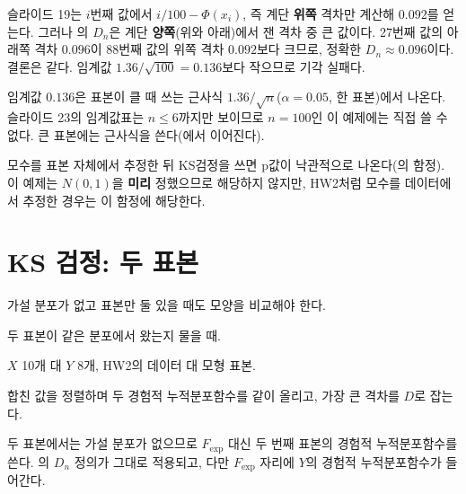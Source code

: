 \begin{pitfall}[슬라이드 값은 $D_n = 0.092$, 다시 계산하면 $D_n =
0.096$]
슬라이드 19는 $i$번째 값에서 $i/100 - \Phi(x_i)$, 즉 계단
\textbf{위쪽} 격차만 계산해 $0.092$를 얻는다. 그러나
의 $D_n$은 계단 \textbf{양쪽}(위와 아래)에서
잰 격차 중 큰 값이다. 27번째 값의 아래쪽 격차 $0.096$이 88번째 값의
위쪽 격차 $0.092$보다 크므로, 정확한 $D_n \approx 0.096$이다.
결론은 같다. 임계값 $1.36/\sqrt{100} = 0.136$보다 작으므로 기각
실패다.
\end{pitfall}

임계값 $0.136$은 표본이 클 때 쓰는 근사식 $1.36/\sqrt n$($\alpha =
0.05$, 한 표본)에서 나온다. 슬라이드 23의 임계값표는
$n \le 6$까지만 보이므로 $n = 100$인 이 예제에는 직접 쓸 수 없다.
큰 표본에는 근사식을 쓴다(에서 이어진다).

모수를 표본 자체에서 추정한 뒤 KS검정을 쓰면 p값이 낙관적으로
나온다(의 함정). 이 예제는 $N(0,1)$을
\textbf{미리} 정했으므로 해당하지 않지만, HW2처럼 모수를 데이터에서
추정한 경우는 이 함정에 해당한다.

\section{KS 검정: 두 표본}
\label{sec:cd-ks-two}

\begin{inbrief}
  \item[Why] 가설 분포가 없고 표본만 둘 있을 때도 모양을 비교해야
             한다.
  \item[When] 두 표본이 같은 분포에서 왔는지 물을 때.
  \item[Where] $X$ 10개 대 $Y$ 8개, HW2의 데이터 대 모형 표본.
  \item[How] 합친 값을 정렬하며 두 경험적 누적분포함수를 같이
             올리고, 가장 큰 격차를 $D$로 잡는다.
\end{inbrief}

두 표본에서는 가설 분포가 없으므로 $F_{\text{exp}}$ 대신 두 번째
표본의 경험적 누적분포함수를 쓴다. 의 $D_n$
정의가 그대로 적용되고, 다만 $F_{\text{exp}}$ 자리에 $Y$의 경험적
누적분포함수가 들어간다.

